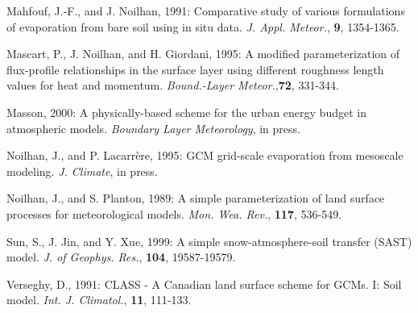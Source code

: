 \begin{description}
\item
Mahfouf, J.-F., and J. Noilhan, 1991:
Comparative study of various formulations of evaporation
from bare soil using in situ data.
{\em J. Appl. Meteor.}, {\bf 9}, 1354-1365.


\item
Mascart, P., J. Noilhan, and H. Giordani, 1995:
A modified parameterization of flux-profile relationships
in the surface layer using different roughness length
values for heat and momentum.
{\em Bound.-Layer Meteor.},{\bf 72}, 331-344.

\item
Masson, 2000:
A physically-based scheme for the urban energy budget in atmospheric models.
{\it Boundary Layer Meteorology}, in press.

\item
Noilhan, J., and P. Lacarr\`ere, 1995:
GCM grid-scale evaporation from mesoscale modeling.
{\em J. Climate},
in press.

\item
Noilhan, J., and S. Planton, 1989:
A simple parameterization of land surface processes for
meteorological models.
{\em Mon. Wea. Rev.}, {\bf 117}, 536-549.

\item
Sun, S.,
J. Jin, and Y. Xue, 1999:
A simple snow-atmosphere-soil transfer (SAST) model.
{\em J. of Geophys. Res.},
{\bf 104},
19587-19579.

\item
Verseghy, D., 1991:
CLASS - A Canadian land surface scheme for GCMs.
I:  Soil model.
{\em Int. J. Climatol.},
{\bf 11},
111-133.

\end{description}

